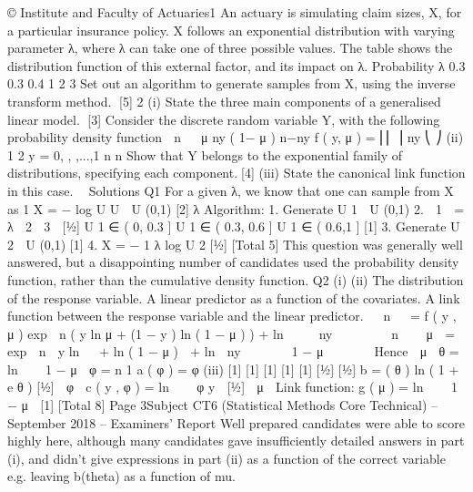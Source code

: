 \documentclass[a4paper,12pt]{article}
\begin{document}
 © Institute and Faculty of Actuaries1
An actuary is simulating claim sizes, X, for a particular insurance policy. X follows
an exponential distribution with varying parameter λ, where λ can take one of three
possible values.
The table shows the distribution function of this external factor, and its impact on λ.
Probability
λ
0.3 0.3 0.4
1 2 3
Set out an algorithm to generate samples from X, using the inverse transform method.
[5]
2
(i)
State the three main components of a generalised linear model.
[3]
Consider the discrete random variable Y, with the following probability density
function
⎛ n ⎞
⎟ μ ny ( 1− μ ) n−ny
f ( y, μ ) = ⎜⎜
⎟
ny
⎝
⎠
(ii)
1 2
y = 0, , ,...,1
n n
Show that Y belongs to the exponential family of distributions, specifying each
component.[4]
(iii)
State the canonical link function in this case.
	
Solutions
Q1
For a given λ, we know that one can sample from X as
1
X = − log U
U  U (0,1)
[2]
λ
Algorithm:
1. Generate U 1  U (0,1)
2.
 1

=
λ  2
 3

[1⁄2]
U 1 ∈ ( 0, 0.3 ]
U 1 ∈ ( 0.3, 0.6 ]
U 1 ∈ ( 0.6,1 ]
[1]
3. Generate U 2  U (0,1)
[1]
4. X = −
1
λ
log U 2
[1⁄2]
[Total 5]
This question was generally well answered, but a disappointing number of candidates used
the probability density function, rather than the cumulative density function.
Q2
(i)
(ii)
The distribution of the response variable.
A linear predictor as a function of the covariates.
A link function between the response variable and the linear predictor.

 n  
=
f ( y , μ ) exp  n ( y ln μ + (1 − y ) ln ( 1 − μ ) ) + ln   
 ny  

 

 n  
 μ 
= exp  n  y ln 
 + ln ( 1 − μ )  + ln  ny  
  
 1 − μ 
   

Hence
 μ 
θ = ln 

 1 − μ 
φ = n
1
a ( φ ) =
φ
(iii)
[1]
[1]
[1]
[1]
[1]
[1⁄2]
[1⁄2]
b =
( θ ) ln ( 1 + e θ ) [1⁄2]
 φ 
c ( y , φ ) = ln  
 φ y  [1⁄2]
 μ 
Link function: g ( μ ) = ln 

 1 − μ  [1]
[Total 8]
Page 3Subject CT6 (Statistical Methods Core Technical) – September 2018 – Examiners’ Report
Well prepared candidates were able to score highly here, although many candidates gave
insufficiently detailed answers in part (i), and didn’t give expressions in part (ii) as a function
of the correct variable e.g. leaving b(theta) as a function of mu.
\end{document}
